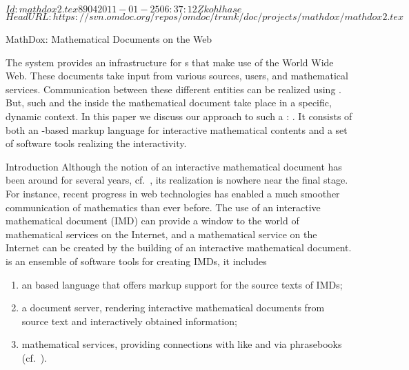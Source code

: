 \svnInfo $Id: mathdox2.tex 8904 2011-01-25 06:37:12Z kohlhase $
\svnKeyword $HeadURL: https://svn.omdoc.org/repos/omdoc/trunk/doc/projects/mathdox/mathdox2.tex $

\begin{omgroup}[id=mathdox2,short=MathDox,creators={amc,cuypers,barreiro}]
                        {MathDox: Mathematical Documents on the Web}

\renewcommand{\CAS}{\indextoo{CAS}}


The {\MathDox} system provides an infrastructure for
{s} that make use of the World Wide Web.
These documents take input from various sources, users, and mathematical services.
Communication between these different entities can be realized using {\openmath}.  But,
such {} and the {} inside the mathematical
document take place in a specific, dynamic context. In this paper we discuss our approach
to such a {}: {\MathDox}.  It consists of both an
{\xml}-based markup language for interactive mathematical contents and a set of software
tools realizing the interactivity.

\begin{omgroup}{Introduction}
Although the notion of an interactive mathematical document has been around for several
years, cf.~\cite{CohMee:tapap98}, its realization is nowhere near the final stage. For
instance, recent progress in web technologies has enabled a much smoother communication of
mathematics than ever before. The use of an interactive mathematical document (IMD) can
provide a window to the world of mathematical services on the Internet, and a mathematical
service on the Internet can be created by the building of an interactive mathematical
document.  {\MathDox} is an ensemble of software tools for creating IMDs, it includes
\begin{enumerate}
\item an {\xml} based language that offers markup support for the source texts of IMDs;
\item a document server, rendering interactive mathematical documents from source text and
  interactively obtained information;
\item mathematical services, providing connections with {\CAS{s}} like {\mathematica} and
  {\gap} via {\openmath} phrasebooks (cf.~\cite{URL:omsoc}).
\end{enumerate}


\end{omgroup}
\end{omgroup}
